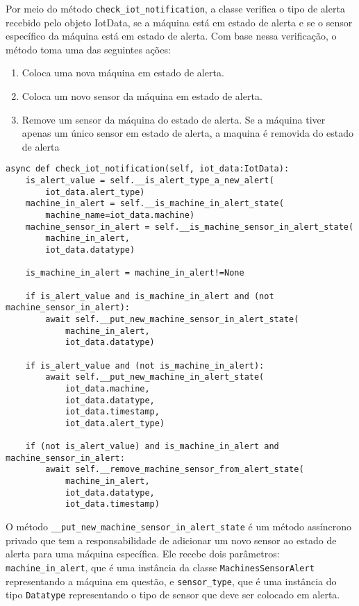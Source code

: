 Por meio do método \texttt{check\_iot\_notification}, a classe verifica o tipo de alerta recebido pelo objeto IotData, se a máquina está em estado de alerta e se o sensor específico da máquina está em estado de alerta. Com base nessa verificação, o método toma uma das seguintes ações:

\begin{enumerate}
    \item Coloca uma nova máquina em estado de alerta.
    \item Coloca um novo sensor da máquina em estado de alerta.
    \item Remove um sensor da máquina do estado de alerta. Se a máquina tiver apenas um único sensor em estado de alerta, a maquina é removida do estado de alerta
\end{enumerate}


\begin{verbatim}
async def check_iot_notification(self, iot_data:IotData):
    is_alert_value = self.__is_alert_type_a_new_alert(
        iot_data.alert_type)
    machine_in_alert = self.__is_machine_in_alert_state(
        machine_name=iot_data.machine)
    machine_sensor_in_alert = self.__is_machine_sensor_in_alert_state(
        machine_in_alert,
        iot_data.datatype)

    is_machine_in_alert = machine_in_alert!=None

    if is_alert_value and is_machine_in_alert and (not machine_sensor_in_alert):
        await self.__put_new_machine_sensor_in_alert_state(
            machine_in_alert,
            iot_data.datatype)

    if is_alert_value and (not is_machine_in_alert):
        await self.__put_new_machine_in_alert_state(
            iot_data.machine,
            iot_data.datatype,
            iot_data.timestamp,
            iot_data.alert_type)

    if (not is_alert_value) and is_machine_in_alert and machine_sensor_in_alert:
        await self.__remove_machine_sensor_from_alert_state(
            machine_in_alert,
            iot_data.datatype,
            iot_data.timestamp)
\end{verbatim}

O método \texttt{\_\_put\_new\_machine\_sensor\_in\_alert\_state} é um método assíncrono privado que tem a responsabilidade de adicionar um novo sensor ao estado de alerta para uma máquina específica. Ele recebe dois parâmetros: \texttt{machine\_in\_alert}, que é uma instância da classe \texttt{MachinesSensorAlert} representando a máquina em questão, e \texttt{sensor\_type}, que é uma instância do tipo \texttt{Datatype} representando o tipo de sensor que deve ser colocado em alerta.

